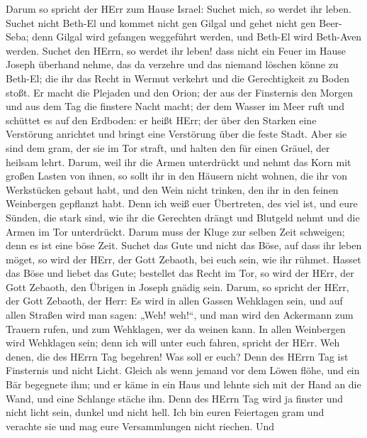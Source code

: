 Darum so spricht der HErr zum Hause Israel: Suchet mich, so werdet ihr
leben.  Suchet nicht Beth-El und kommet nicht gen Gilgal und
gehet nicht gen Beer-Seba; denn Gilgal wird gefangen weggeführt werden,
und Beth-El wird Beth-Aven werden.  Suchet den HErrn, so
werdet ihr leben! dass nicht ein Feuer im Hause Joseph überhand nehme,
das da verzehre und das niemand löschen könne zu Beth-El; 
die ihr das Recht in Wermut verkehrt und die Gerechtigkeit zu Boden
stoßt.  Er macht die Plejaden und den Orion; der aus der
Finsternis den Morgen und aus dem Tag die finstere Nacht macht; der dem
Wasser im Meer ruft und schüttet es auf den Erdboden: er heißt HErr;
 der über den Starken eine Verstörung anrichtet und bringt
eine Verstörung über die feste Stadt.  Aber sie sind dem
gram, der sie im Tor straft, und halten den für einen Gräuel, der
heilsam lehrt.  Darum, weil ihr die Armen unterdrückt und
nehmt das Korn mit großen Lasten von ihnen, so sollt ihr in den Häusern
nicht wohnen, die ihr von Werkstücken gebaut habt, und den Wein nicht
trinken, den ihr in den feinen Weinbergen gepflanzt habt. 
Denn ich weiß euer Übertreten, des viel ist, und eure Sünden, die stark
sind, wie ihr die Gerechten drängt und Blutgeld nehmt und die Armen im
Tor unterdrückt.  Darum muss der Kluge zur selben Zeit
schweigen; denn es ist eine böse Zeit.  Suchet das Gute und
nicht das Böse, auf dass ihr leben möget, so wird der HErr, der Gott
Zebaoth, bei euch sein, wie ihr rühmet.  Hasset das Böse
und liebet das Gute; bestellet das Recht im Tor, so wird der HErr, der
Gott Zebaoth, den Übrigen in Joseph gnädig sein.  Darum, so
spricht der HErr, der Gott Zebaoth, der Herr: Es wird in allen Gassen
Wehklagen sein, und auf allen Straßen wird man sagen: „Weh! weh!{}``,
und man wird den Ackermann zum Trauern rufen, und zum Wehklagen, wer da
weinen kann.  In allen Weinbergen wird Wehklagen sein; denn
ich will unter euch fahren, spricht der HErr.  Weh denen,
die des HErrn Tag begehren! Was soll er euch? Denn des HErrn Tag ist
Finsternis und nicht Licht.  Gleich als wenn jemand vor dem
Löwen flöhe, und ein Bär begegnete ihm; und er käme in ein Haus und
lehnte sich mit der Hand an die Wand, und eine Schlange stäche ihn.
 Denn des HErrn Tag wird ja finster und nicht licht sein,
dunkel und nicht hell.  Ich bin euren Feiertagen gram und
verachte sie und mag eure Versammlungen nicht riechen.  Und
